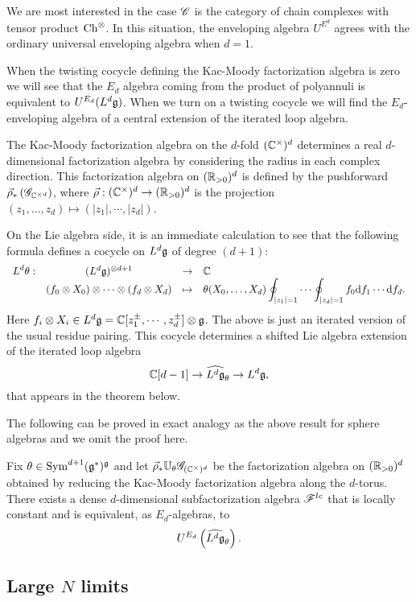 We are most interested in the case $\mathscr C$ is the category of chain complexes with tensor product ${\rm Ch}^{\otimes}$. 
In this situation, the enveloping algebra $U^{E^d}$ agrees with the ordinary universal enveloping algebra when $d=1$.

When the twisting cocycle defining the Kac-Moody factorization algebra is zero we will see that the $E_d$ algebra coming from the product of polyannuli is equivalent to $U^{E_d} (L^d \mathfrak g)$.
When we turn on a twisting cocycle we will find the $E_d$-enveloping algebra of a central extension of the iterated loop algebra. 

The Kac-Moody factorization algebra on the $d$-fold $(\mathbb C^\times)^d$ determines a real $d$-dimensional factorization algebra by considering the radius in each complex direction. 
This factorization algebra on $(\mathbb R_{>0})^d$ is defined by the pushforward $\vec{\rho}_*\left(\mathscr G_{\mathbb C^{\times d}}\right)$, 
where $\vec{\rho} : (\mathbb C^\times)^d \to (\mathbb R_{>0})^d$ is the projection $(z_1,\ldots,z_d) \mapsto (|z_1|, \cdots, |z_d|)$. 

On the Lie algebra side, it is an immediate calculation to see that the following formula defines a cocycle on $L^d \mathfrak g$ of degree $(d+1)$:
\[
\begin{array}{cccl}
\displaystyle L^d \theta : & (L^d \mathfrak g)^{\otimes d + 1} & \to & \mathbb C \\
\displaystyle & (f_0 \otimes X_0)\otimes \cdots \otimes (f_d \otimes X_d) & \mapsto & \displaystyle  \theta(X_0,\ldots,X_d)  \oint_{|z_1| = 1} \cdots \oint_{|z_d| = 1} f_0 {\rm d} f_1 \cdots {\rm d} f_d .
\end{array}
\]
Here $f_i \otimes X_i \in L^d \mathfrak g = \mathbb C[z_1^{\pm}, \cdots, z_d^{\pm}] \otimes \mathfrak g$. 
The above is just an iterated version of the usual residue pairing.
This cocycle determines a shifted Lie algebra extension of the iterated loop algebra
\[
\mathbb C[d-1] \to \widehat{L^d \mathfrak g}_\theta \to L^d \mathfrak g,
\]
that appears in the theorem below. 

The following can be proved in exact analogy as the above result for sphere algebras and we omit the proof here.

\begin{prop}
Fix $\theta \in {\rm Sym}^{d+1}(\mathfrak g^*)^\mathfrak g$ and let $\vec{\rho}_* \mathbb U_\theta \mathscr G_{(\mathbb C^\times)^d}$ be the factorization algebra on $(\mathbb R_{>0})^d$ obtained by reducing the Kac-Moody factorization algebra along the $d$-torus.
There exists a dense $d$-dimensional subfactorization algebra $\mathscr F^{lc}$ that is locally constant and is equivalent, as $E_d$-algebras, to
\[
U^{E_d} \left( \widehat{L^d \mathfrak g}_{\theta} \right) .
\]
\end{prop}



\subsection{Large $N$ limits}

